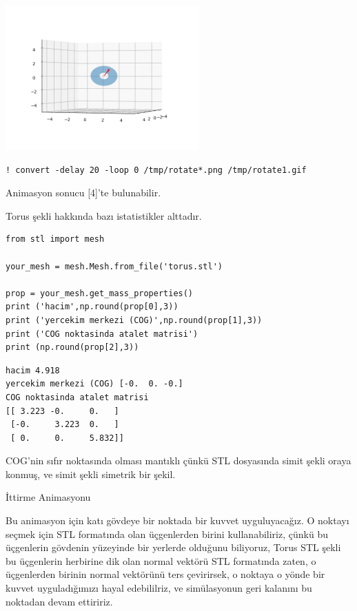 \documentclass[12pt,fleqn]{article}\usepackage{../../common}
\begin{document}
\includegraphics[width=20em]{sim1/rotate_14.png}

\begin{verbatim}
! convert -delay 20 -loop 0 /tmp/rotate*.png /tmp/rotate1.gif
\end{verbatim}

Animasyon sonucu [4]'te bulunabilir.

Torus şekli hakkında bazı istatistikler alttadır.

\begin{verbatim}
from stl import mesh

your_mesh = mesh.Mesh.from_file('torus.stl')

prop = your_mesh.get_mass_properties()
print ('hacim',np.round(prop[0],3))
print ('yercekim merkezi (COG)',np.round(prop[1],3))
print ('COG noktasinda atalet matrisi')
print (np.round(prop[2],3))
\end{verbatim}

\begin{verbatim}
hacim 4.918
yercekim merkezi (COG) [-0.  0. -0.]
COG noktasinda atalet matrisi
[[ 3.223 -0.     0.   ]
 [-0.     3.223  0.   ]
 [ 0.     0.     5.832]]
\end{verbatim}

COG'nin sıfır noktasında olması mantıklı çünkü STL dosyasında simit şekli oraya
konmuş, ve simit şekli simetrik bir şekil.


İttirme Animasyonu

Bu animasyon için katı gövdeye bir noktada bir kuvvet uyguluyacağız. O noktayı
seçmek için STL formatında olan üçgenlerden birini kullanabiliriz, çünkü bu
üçgenlerin gövdenin yüzeyinde bir yerlerde olduğunu biliyoruz, Torus STL şekli
bu üçgenlerin herbirine dik olan normal vektörü STL formatında zaten, o
üçgenlerden birinin normal vektörünü ters çevirirsek, o noktaya o yönde bir
kuvvet uyguladığımızı hayal edebililriz, ve simülasyonun geri kalanını bu
noktadan devam ettiririz.
\end{document}
